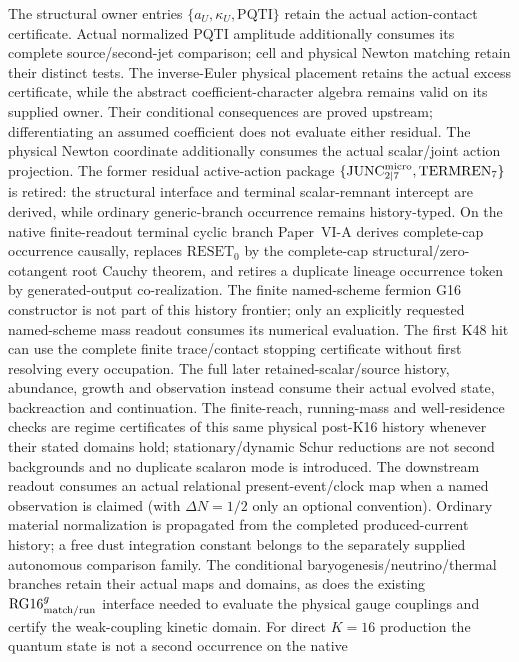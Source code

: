\documentclass[12pt,a4paper]{article}
\begin{document}
The structural owner entries
$\{a_U,\kappa_U,\mathrm{PQTI}\}$ retain the actual action-contact
certificate. Actual normalized PQTI amplitude additionally consumes its
complete source/second-jet comparison; cell and physical Newton matching
retain their distinct tests. The inverse-Euler physical placement retains
the actual excess certificate, while the abstract coefficient-character
algebra remains valid on its supplied owner. Their conditional consequences are
proved upstream; differentiating an assumed coefficient does not evaluate
either residual. The physical Newton coordinate additionally consumes the
actual scalar/joint action projection. The former residual active-action package
\(\{\mathrm{JUNC}_{2\mid7}^{\rm micro},\mathrm{TERMREN}_7\}\) is retired:
the structural interface and terminal scalar-remnant intercept are derived,
while ordinary generic-branch occurrence remains history-typed.  On the native
finite-readout terminal cyclic branch Paper~VI-A derives complete-cap
occurrence causally, replaces \(\mathrm{RESET}_0\) by the complete-cap
structural/zero-cotangent root Cauchy theorem, and retires a duplicate lineage
occurrence token by generated-output co-realization.
The finite named-scheme fermion G16 constructor is not part of this history frontier; only an explicitly requested named-scheme mass readout consumes its numerical evaluation.
The first K48 hit can use the complete finite trace/contact stopping
certificate without first resolving every occupation.  The full later
retained-scalar/source history, abundance, growth and observation instead
consume their actual evolved state, backreaction and continuation.  The finite-reach, running-mass and well-residence
checks are regime certificates of this same physical post-K16 history whenever
their stated domains hold; stationary/dynamic Schur reductions are not second
backgrounds and no duplicate scalaron mode is introduced.
The downstream readout consumes an actual relational present-event/clock map
when a named observation is claimed (with \(\Delta N=1/2\) only an optional
convention).  Ordinary material normalization is propagated from the completed
produced-current history; a free dust integration constant belongs to the
separately supplied autonomous comparison family.  The conditional
baryogenesis/neutrino/thermal branches retain their actual maps and domains,
as does the existing
\(\mathrm{RG16}^{g}_{\rm match/run}\) interface needed to evaluate the physical
gauge couplings and certify the weak-coupling kinetic domain.  For direct
\(K=16\) production the quantum state is not a second occurrence on the native
\end{document}
